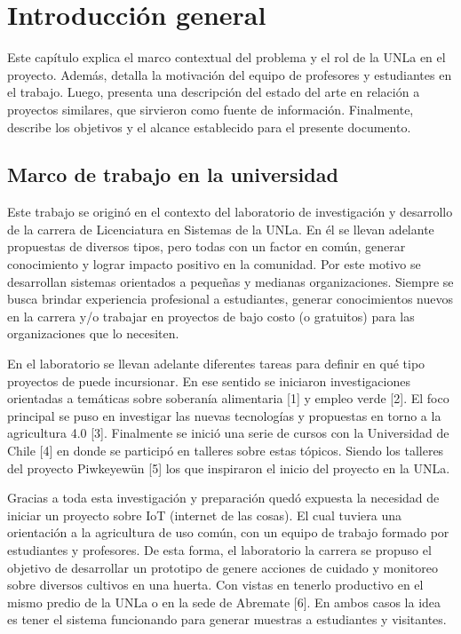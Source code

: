 \chapter{Introducción general} %

Este capítulo explica el marco contextual del problema y el rol de la UNLa en el proyecto. Además, detalla la motivación del equipo de profesores y estudiantes en el trabajo. Luego, presenta una descripción del estado del arte en relación a proyectos similares, que sirvieron como fuente de información. Finalmente, describe los objetivos y el alcance establecido para el presente documento.\\

\section{Marco de trabajo en la universidad}
Este trabajo se originó en el contexto del laboratorio de investigación y desarrollo de la carrera de Licenciatura en Sistemas de la UNLa. En él se llevan adelante propuestas de diversos tipos, pero todas con un factor en común, generar conocimiento y lograr impacto positivo en la comunidad. Por este motivo se desarrollan sistemas orientados a pequeñas y medianas organizaciones. Siempre se busca brindar experiencia profesional a estudiantes, generar conocimientos nuevos en la carrera y/o trabajar en proyectos de bajo costo (o gratuitos) para las organizaciones que lo necesiten.

En el laboratorio se llevan adelante diferentes tareas para definir en qué tipo proyectos de puede incursionar. En ese sentido se iniciaron investigaciones orientadas a temáticas sobre soberanía alimentaria [1] y empleo verde [2]. El foco principal se puso en investigar las nuevas tecnologías y propuestas en torno a la agricultura 4.0 [3]. Finalmente se inició una serie de cursos con la Universidad de Chile [4] en donde se participó en talleres sobre estas tópicos. Siendo los talleres del proyecto Piwkeyewün [5] los que inspiraron el inicio del proyecto en la UNLa.

Gracias a toda esta investigación y preparación quedó expuesta la necesidad de iniciar un proyecto sobre IoT (internet de las cosas). El cual tuviera una orientación a la agricultura de uso común, con un equipo de trabajo formado por estudiantes y profesores. De esta forma, el laboratorio la carrera se propuso el objetivo de desarrollar un prototipo de genere acciones de cuidado y monitoreo sobre diversos cultivos en una huerta. Con vistas en tenerlo productivo en el mismo predio de la UNLa o en la sede de Abremate [6]. En ambos casos la idea es tener el sistema funcionando para generar muestras a estudiantes y visitantes.

